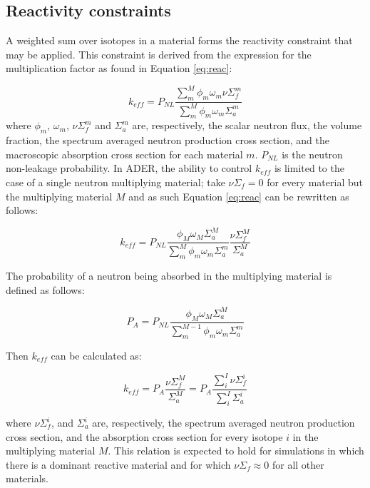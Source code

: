 \subsection{Reactivity constraints} \label{ssec:reactivity}
A weighted sum over isotopes in a material forms the reactivity constraint that
may be applied. This constraint is derived from the expression for the 
multiplication factor as found in Equation \ref{eq:reac}:

\begin{equation}
\label{eq:reac}
k_{eff} = P_{NL} \frac{\sum\limits^{M}_{m}\phi_m\omega_m\nu\Sigma_{f}^{m}}
{\sum\limits^{M}_{m}\phi_m\omega_m   \Sigma_{a}^{m}}
\end{equation}
%
where $\phi_m$, $\omega_m$, $ \nu\Sigma_{f}^{m}$ and $ \Sigma_{a}^{m}$ are, 
respectively, the scalar neutron flux, the volume fraction, the spectrum 
averaged neutron production cross section, and the macroscopic absorption cross
section for each material $m$. $P_{NL}$ is the neutron non-leakage probability.
In ADER, the ability to control $k_{eff}$ is limited to the case of a single 
neutron multiplying material; take $\nu\Sigma_{f}=0$ for every material but the
multiplying material $M$ and as such Equation \ref{eq:reac} can be rewritten as
follows:

\begin{equation}
\label{eq:reac_one_material}
k_{eff} = P_{NL} \frac{\phi_M\omega_{M}\Sigma_{a}^{M}}{\sum\limits^{M}_{m}\phi_m\omega_m \Sigma_{a}^{m}} \frac{\nu\Sigma_{f}^{M}}{\Sigma_{a}^{M}}
\end{equation}

The probability of a neutron being absorbed in the multiplying material is 
defined as follows:

\begin{equation}
\label{eq:abs_prob}
P_{A} = P_{NL} \frac{\phi_M\omega_{M}\Sigma_{a}^{M}} {\sum\limits^{M-1}_{m}\phi_{m}\omega_m\Sigma_{a}^{m}}
\end{equation}

Then $k_{eff}$ can be calculated as:

\begin{equation}
\label{eq:reac_modified}
k_{eff} = P_{A} \frac{\nu\Sigma_{f}^{M}}{\Sigma_{a}^{M}} = P_{A} \frac{\sum\limits^{I}_{i}\nu\Sigma_{f}^{i}}{\sum\limits^{I}_{i}\Sigma_{a}^{i}}
\end{equation}

where $\nu\Sigma_{f}^i$, and $\Sigma_{a}^i$ are, respectively, the spectrum 
averaged neutron production cross section, and the absorption cross section for
every isotope $i$ in the multiplying material $M$. This relation is expected to
hold for simulations in which there is a dominant reactive material and for 
which $\nu\Sigma_{f} \approx 0$ for all other materials.

